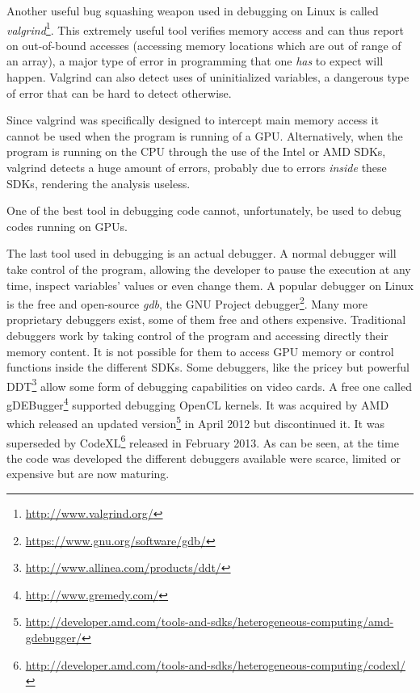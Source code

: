 \label{section:tools:opencl:valgrind}

Another useful bug squashing weapon used in debugging on Linux is called
\textit{valgrind}\footnote{\url{http://www.valgrind.org/}}. This extremely
useful tool verifies memory access and can thus report on out-of-bound accesses
(accessing memory locations which are out of range of an array), a major
type of error in programming that one \textit{has} to expect will happen.
Valgrind can also detect uses of uninitialized variables, a dangerous type of
error that can be hard to detect otherwise.

Since valgrind was specifically designed to intercept main memory access it
cannot be used when the program is running of a GPU. Alternatively, when the
program is running on the CPU through the use of the Intel or AMD SDKs, valgrind
detects a huge amount of errors, probably due to errors \textit{inside} these
SDKs, rendering the analysis useless.

One of the best tool in debugging code cannot, unfortunately, be used to debug
codes running on GPUs.



The last tool used in debugging is an actual debugger. A normal debugger will
take control of the program, allowing the developer to pause the execution
at any time, inspect variables' values or even change them. A popular debugger
on Linux is the free and open-source \textit{gdb}, the GNU Project
debugger\footnote{\url{https://www.gnu.org/software/gdb/}}. Many more
proprietary debuggers exist, some of them free and others expensive. Traditional
debuggers work by taking control of the program and accessing
directly their memory content. It is not possible for them to access GPU memory
or control functions inside the different SDKs. Some debuggers, like
the pricey but powerful DDT\footnote{\url{http://www.allinea.com/products/ddt/}}
allow some form of debugging capabilities on video cards. A free one
called gDEBugger\footnote{\url{http://www.gremedy.com/}} supported
debugging OpenCL kernels. It was acquired by AMD which released an updated
version\footnote{\url{http://developer.amd.com/tools-and-sdks/heterogeneous-computing/amd-gdebugger/}}
in April 2012 but discontinued it. It was superseded by
CodeXL\footnote{\url{http://developer.amd.com/tools-and-sdks/heterogeneous-computing/codexl/}}
released in February 2013. As can be seen, at the time the code was developed
the different debuggers available were scarce, limited or expensive but are now
maturing.


